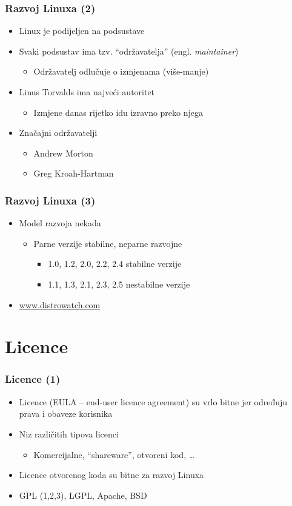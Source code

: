 \documentclass{beamer}
\begin{document}
\begin{frame}[t]
\frametitle{Razvoj Linuxa (2)}
\begin{itemize}
  \item Linux je podijeljen na podsustave
  \item Svaki podsustav ima tzv. ``održavatelja'' (engl. 
        \emph{maintainer})
  \begin{itemize}
    \item Održavatelj odlučuje o izmjenama (više-manje)
  \end{itemize}
  \item Linus Torvalds ima najveći autoritet
  \begin{itemize}
    \item Izmjene danas rijetko idu izravno preko njega
  \end{itemize}
  \item Značajni održavatelji
  \begin{itemize}
    \item Andrew Morton
    \item Greg Kroah-Hartman
  \end{itemize}
\end{itemize}
\end{frame}

\begin{frame}[t]
\frametitle{Razvoj Linuxa (3)}
\begin{itemize}
  \item Model razvoja nekada
  \begin{itemize}
    \item Parne verzije stabilne, neparne razvojne
    \begin{itemize}
      \item 1.0, 1.2, 2.0, 2.2, 2.4 stabilne verzije
      \item 1.1, 1.3, 2.1, 2.3, 2.5 nestabilne verzije
    \end{itemize}
  \end{itemize}
  \item \url{www.distrowatch.com}
\end{itemize}
\end{frame}

\section{Licence}
\begin{frame}[t]
\frametitle{Licence (1)}
\begin{itemize}
  \item Licence (EULA -- end-user licence agreement) su vrlo bitne jer
        određuju prava i obaveze korisnika
  \item Niz različitih tipova licenci
  \begin{itemize}
    \item Komercijalne, ``shareware'', otvoreni kod, \ldots
  \end{itemize}
  \item Licence otvorenog koda su bitne za razvoj Linuxa
  \item GPL (1,2,3), LGPL, Apache, BSD
\end{itemize}
\end{frame}
\end{document}
